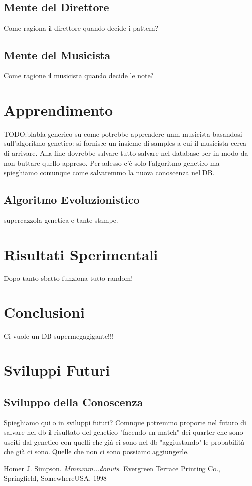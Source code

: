 \documentclass[a4paper,10pt]{article}
\begin{document}
\subsection{Mente del Direttore}
Come ragiona il direttore quando decide i pattern?
\subsection{Mente del Musicista}
Come ragione il musicista quando decide le note?

\section{Apprendimento}
TODO:blabla generico su come potrebbe apprendere unm musicista basandosi sull'algoritmo genetico:
si fornisce un insieme di samples a cui il musicista cerca di arrivare. 
Alla fine dovrebbe salvare tutto salvare nel database per in modo da non buttare quello appreso.
Per adesso c'è solo l'algoritmo genetico ma spieghiamo comunque come salvaremmo la nuova conoscenza nel DB.  
\subsection{Algoritmo Evoluzionistico}
supercazzola genetica e tante stampe.

\section{Risultati Sperimentali}
Dopo tanto sbatto funziona tutto random!

\section{Conclusioni}
Ci vuole un DB supermegagigante!!!

\section{Sviluppi Futuri}
\subsection{Sviluppo della Conoscenza}
Spieghiamo qui o in sviluppi futuri? Comnque potremmo proporre nel futuro di salvare nel db 
il risultato del genetico "facendo un match" dei quarter che sono usciti dal genetico con quelli che già
ci sono nel db "aggiustando" le probabilità che già ci sono. Quelle che non ci sono possiamo aggiungerle. 

\begin{thebibliography}{50}
   Homer J. Simpson. \textsl{Mmmmm...donuts}.
		Evergreen Terrace Printing Co., Springfield, SomewhereUSA, 1998
\end{thebibliography}
\end{document}
